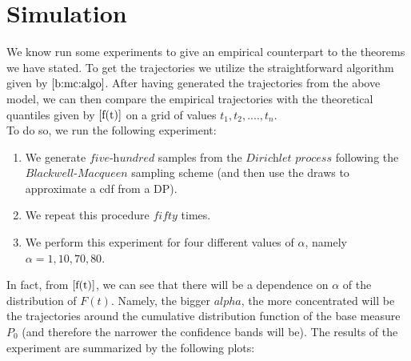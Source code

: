 \documentclass{article}
\begin{document}
\section{Simulation}
We know run some experiments to give an empirical counterpart to the theorems we have stated. To get the trajectories we utilize the straightforward algorithm given by $\ref{b:mc:algo}$. After having generated the trajectories from the above model, we can then compare the empirical trajectories with the theoretical quantiles given by $\eqref{f(t)}$ on a grid of values $t_1,t_2,...., t_n$.\\
To do so, we run the following experiment: 
\begin{enumerate}
    \item We generate $\textit{five-hundred}$ samples from the $\textit{Dirichlet process}$ following the $\textit{Blackwell-Macqueen}$ sampling scheme (and then use the draws to approximate a cdf from a DP).
    \item We repeat this procedure $\textit{fifty}$ times.
    \item We perform this experiment for four different values of $\alpha$, namely $\alpha=1, 10, 70, 80$.
\end{enumerate}
In fact, from $\eqref{f(t)}$, we can see that there will be a dependence on $\alpha$ of the distribution of $F(t)$. Namely, the bigger $alpha$, the more concentrated will be the trajectories around the cumulative distribution function of the base measure $P_0$ (and therefore the narrower the confidence bands will be).
The results of the experiment are summarized by the following plots:
\end{document}
